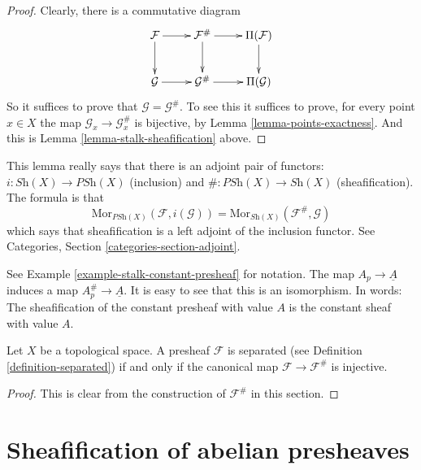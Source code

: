 \begin{proof}
Clearly, there is a commutative diagram
$$
\xymatrix{
\mathcal{F} \ar[r] \ar[d] &
\mathcal{F}^\# \ar[r] \ar[d] &
\Pi(\mathcal{F}) \ar[d] \\
\mathcal{G} \ar[r] &
\mathcal{G}^\# \ar[r] &
\Pi(\mathcal{G}) \\
}
$$
So it suffices to prove that $\mathcal{G} = \mathcal{G}^\#$.
To see this it suffices to prove, for every point $x \in X$ the
map $\mathcal{G}_x \to \mathcal{G}^\#_x$ is bijective, by
Lemma \ref{lemma-points-exactness}. And this is Lemma
\ref{lemma-stalk-sheafification} above.
\end{proof}

\noindent
This lemma really says that there is an adjoint pair
of functors: $i : \textit{Sh}(X) \to \textit{PSh}(X)$
(inclusion) and $\# : \textit{PSh}(X) \to \textit{Sh}(X)$
(sheafification). The formula is that
$$
\text{Mor}_{\textit{PSh}(X)}(\mathcal{F}, i(\mathcal{G}))
=
\text{Mor}_{\textit{Sh}(X)}(\mathcal{F}^\#, \mathcal{G})
$$
which says that sheafification is a left adjoint of
the inclusion functor. See Categories, Section
\ref{categories-section-adjoint}.

\begin{example}
\label{example-sheafify-constant}
See Example \ref{example-stalk-constant-presheaf} for notation.
The map $A_p \to \underline{A}$ induces a map
$A_p^\# \to \underline{A}$. It is easy to see that this
is an isomorphism. In words: The sheafification
of the constant presheaf with value $A$ is the
constant sheaf with value $A$.
\end{example}

\begin{lemma}
\label{lemma-separated-presheaf-into-sheaf}
Let $X$ be a topological space.
A presheaf $\mathcal{F}$ is separated (see
Definition \ref{definition-separated}) if and only if
the canonical map $\mathcal{F} \to \mathcal{F}^\#$ is injective.
\end{lemma}

\begin{proof}
This is clear from the construction of $\mathcal{F}^\#$ in this
section.
\end{proof}



\section{Sheafification of abelian presheaves}
\label{section-sheafify-abelian-presheaves}

